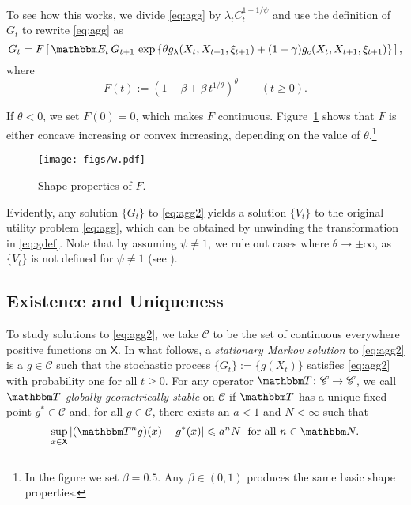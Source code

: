 \documentclass[12pt, reqno]{amsart}
\renewcommand{\leq}{\leqslant}
\renewcommand{\geq}{\geqslant}
\newcommand{\1}{\mathbbm 1}
\newcommand{\cC}{\mathscr C}
\newcommand{\NN}{\mathbbm N}
\newcommand{\EE}{\mathbbm E}
\newcommand{\TT}{\mathbbm T}
\newcommand{\XX}{\mathsf X}
\theoremstyle{plain}
\theoremstyle{definition}
\begin{document}
To see how this works, we 
divide \eqref{eq:agg} by $\lambda_t C_t^{1-1/\psi}$
and use the definition of $G_t$ to rewrite 
\eqref{eq:agg} as
%
\begin{equation}\label{eq:agg2}
    G_t = 
    F 
    \left[ 
        \,
        \EE_t \, G_{t+1}  \,
        \exp
        \left\{ 
            \theta g_\lambda(X_t, X_{t+1}, \xi_{t+1})
            + (1-\gamma) g_c(X_t, X_{t+1}, \xi_{t+1})
        \right\}
        \,
    \right],
\end{equation}
%
where
%
\begin{equation*}
    F(t) :=
        \left(
            1-\beta + \beta \, t^{1/\theta} 
        \right)^\theta 
        \qquad (t \geq 0).
\end{equation*}
%

If $\theta < 0$, we set $F(0)=0$, which makes $F$ continuous.
Figure~\ref{f:w} shows that $F$ is either concave increasing or convex
increasing, depending on the value of $\theta$.\footnote{In the figure we set
$\beta = 0.5$.  Any $\beta \in (0,1)$ produces the same basic shape properties.}
%
\begin{figure}
    \centering
    \texttt{[image: figs/w.pdf]}
    \caption{\label{f:w} Shape properties of $F$.}
\end{figure}
%
Evidently, any solution $\{ G_t \}$ to \eqref{eq:agg2} yields a solution $\{
 V_t \}$  to the original utility problem \eqref{eq:agg}, which can be
 obtained by unwinding the transformation in \eqref{eq:gdef}. Note that by
 assuming $\psi \neq 1$, we rule out  cases where $\theta \to \pm \infty$, as
 $\{ V_t \}$ is not defined for $\psi \neq 1$ (see \cite{deGroot2018}). 

\subsection{Existence and Uniqueness}

To study solutions to \eqref{eq:agg2}, we take $\cC$ to be the set of continuous
everywhere positive functions on $\XX$.  In what follows, a \emph{stationary
Markov solution} to \eqref{eq:agg2} is a $g \in \cC$ such that the stochastic
process $\{G_t\} := \{g(X_t)\}$ satisfies \eqref{eq:agg2} with probability one
for all $t \geq 0$.  For any operator $\TT \colon \cC \to \cC$, we call $\TT$
\emph{globally geometrically stable} on $\cC$ if $\TT$ has a unique fixed point $g^*
\in \cC$ and, for all $g \in \cC$, there exists an $a <
1$ and $N < \infty$ such that
%
\begin{equation}
    \sup_{x \in \XX} | (\TT^n g)(x) - g^*(x) |
    \leq a^n N
    \;
    \text{ for all } n \in \NN.
\end{equation}
%
\end{document}
